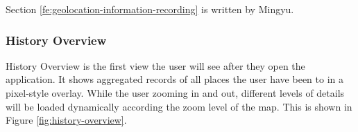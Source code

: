 \documentclass[12pt,a4paper]{article}
\begin{document}
                \footnotesize
                Section \ref{fe:geolocation-information-recording} is written by Mingyu.
                \normalsize
            
            \subsubsection{History Overview} %
            \label{fe:history-overview}
            
            History Overview is the first view the user will see after they open the application. It shows aggregated records of all places the user have been to in a pixel-style overlay. While the user zooming in and out, different levels of details will be loaded dynamically according the zoom level of the map. This is shown in Figure \ref{fig:history-overview}.
            
\end{document}
